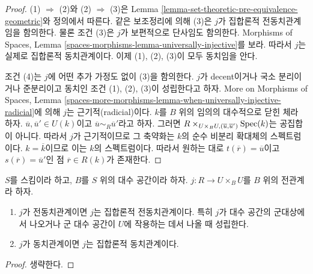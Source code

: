 \begin{proof}
(1) $\Rightarrow$ (2)와 (2) $\Rightarrow$ (3)은 Lemma
\ref{lemma-set-theoretic-pre-equivalence-geometric}와 정의에서 따른다.
같은 보조정리에 의해 (3)은 $j$가 집합론적 전동치관계임을 함의한다.
물론 조건 (3)은 $j$가 보편적으로 단사임도 함의한다. Morphisms of
Spaces, Lemma \ref{spaces-morphisms-lemma-universally-injective}를 보라.
따라서 $j$는 실제로 집합론적 동치관계이다. 이제 (1), (2), (3)이
모두 동치임을 안다.

\medskip\noindent
조건 (4)는 $j$에 어떤 추가 가정도 없이 (3)을 함의한다.
$j$가 decent이거나 국소 분리이거나 준분리이고 동치인 조건
(1), (2), (3)이 성립한다고 하자. More on Morphisms of Spaces, Lemma
\ref{spaces-more-morphisms-lemma-when-universally-injective-radicial}에
의해 $j$는 근기적(radicial)이다.
$k$를 $B$ 위의 임의의 대수적으로 닫힌 체라 하자.
$\overline{u}, \overline{u}' \in U(k)$이고
$\overline{u} \sim_R \overline{u}'$라고 하자. 그러면
$R \times_{U \times_B U, (\overline{u}, \overline{u}')} \mathop{\mathrm{Spec}}(k)$는
공집합이 아니다. 따라서 $j$가 근기적이므로 그 축약화는
$k$의 순수 비분리 확대체의 스펙트럼이다. $k = \overline{k}$이므로
이는 $k$의 스펙트럼이다. 따라서 원하는 대로
$t(\overline{r}) = \overline{u}$이고
$s(\overline{r}) = \overline{u}'$인 점 $\overline{r} \in R(k)$가 존재한다.
\end{proof}

\begin{lemma}
\label{lemma-set-theoretic-equivalence}
$S$를 스킴이라 하고, $B$를 $S$ 위의 대수 공간이라 하자.
$j : R \to U \times_B U$를 $B$ 위의 전관계라 하자.
\begin{enumerate}
\item $j$가 전동치관계이면 $j$는 집합론적 전동치관계이다.
특히 $j$가 대수 공간의 군대상에서 나오거나 군 대수 공간이
$U$에 작용하는 데서 나올 때 성립한다.
\item $j$가 동치관계이면 $j$는 집합론적 동치관계이다.
\end{enumerate}
\end{lemma}

\begin{proof}
생략한다.
\end{proof}

